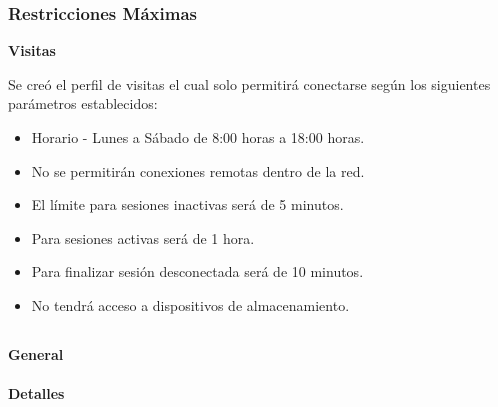 \documentclass[
]{article}
\begin{document}
\hypertarget{section-12}{%
\subsubsection{}\label{section-12}}

\hypertarget{restricciones-muxe1ximas}{%
\subsubsection{Restricciones Máximas}\label{restricciones-muxe1ximas}}

\textbf{Visitas}

Se creó el perfil de visitas el cual solo permitirá conectarse según los
siguientes parámetros establecidos:

\begin{itemize}
\item
  Horario - Lunes a Sábado de 8:00 horas a 18:00 horas.
\item
  No se permitirán conexiones remotas dentro de la red.
\item
  El límite para sesiones inactivas será de 5 minutos.
\item
  Para sesiones activas será de 1 hora.
\item
  Para finalizar sesión desconectada será de 10 minutos.
\item
  No tendrá acceso a dispositivos de almacenamiento.
\end{itemize}

\hypertarget{section-13}{%
\subsection{}\label{section-13}}

\textbf{General}

\hypertarget{detalles-2}{%
\paragraph{Detalles}\label{detalles-2}}
\end{document}
